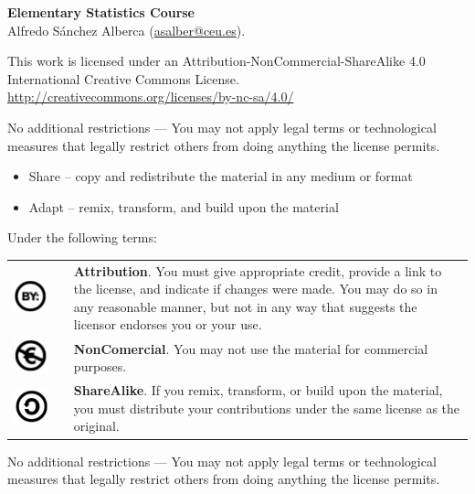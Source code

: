 \sffamily
\small
\noindent \textbf{Elementary Statistics Course}\\
Alfredo Sánchez Alberca (\href{mailto:asalber@ceu.es}{asalber@ceu.es}).
\smallskip

\scriptsize
This work is licensed under an Attribution-NonCommercial-ShareAlike 4.0 International Creative Commons License. 
\url{http://creativecommons.org/licenses/by-nc-sa/4.0/}

\medskip

No additional restrictions — You may not apply legal terms or technological measures that legally restrict others from doing anything the license permits.

\begin{itemize}
\item Share -- copy and redistribute the material in any medium or format
\item Adapt -- remix, transform, and build upon the material
\end{itemize}

Under the following terms:
\begin{center}
\begin{tabular}{ccp{10cm}}
\includegraphics[scale=0.15]{img/cc-by} & \quad & \textbf{Attribution}. You must give appropriate credit, provide a link
to the license, and indicate if changes were made. You may do so in any reasonable manner, but not in any way that
suggests the licensor endorses you or your use.\\ 
\includegraphics[scale=0.15]{img/cc-e} & \quad & \textbf{NonComercial}. You may not use the material for commercial purposes.\\ 
\includegraphics[scale=0.15]{img/cc-c} & \quad & \textbf{ShareAlike}. If you remix, transform, or build upon the
material, you must distribute your contributions under the same license as the original. 
\end{tabular}
\end{center}

No additional restrictions — You may not apply legal terms or technological measures that legally restrict others from
doing anything the license permits.
